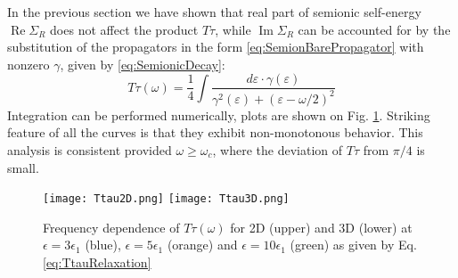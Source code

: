 \documentclass[twocolumn,english,prb]{revtex4-1}
\renewcommand{\Re}{\operatorname{Re}}
\renewcommand{\Im}{\operatorname{Im}}
\begin{document}
In the previous section we have shown that real part of semionic self-energy $\Re \Sigma_R$ does not affect the product $T\tau$, while 
 $\Im \Sigma_R$  can be accounted for by the  substitution of the propagators in the form \eqref{eq:SemionBarePropagator}
 with nonzero  $\gamma$, given by \eqref{eq:SemionicDecay}:
\begin{equation}
\label{eq:TtauRelaxation}
T\tau(\omega)=\frac{1}{4}\int\frac{d\varepsilon\cdot\gamma(\varepsilon)}{\gamma^{2}(\varepsilon)+(\varepsilon-\omega/2)^{2}}
\end{equation}
Integration can be performed numerically, plots are shown on Fig. \ref{fig:Ttau}. Striking feature of all the curves is that they exhibit non-monotonous behavior. This analysis is consistent  provided $\omega \geq \omega_c$, where the deviation of $T \tau$ from $\pi / 4$ is small.

\begin{figure}
	\centering
	\texttt{[image: Ttau2D.png]}
	\texttt{[image: Ttau3D.png]}
	\caption{Frequency dependence of $T \tau(\omega)$ for 2D (upper) and 3D (lower) at $\epsilon = 3 \epsilon_1$ (blue), $\epsilon = 5 \epsilon_1$ (orange) and $\epsilon = 10 \epsilon_1$ (green) as given by Eq. \eqref{eq:TtauRelaxation}}
	\label{fig:Ttau}
\end{figure}
\end{document}
